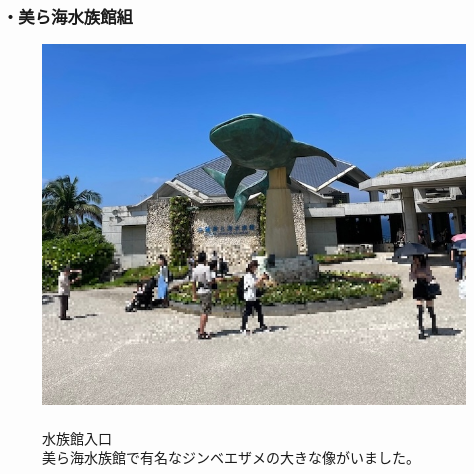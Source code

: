 \documentclass[../main]{subfiles}
\begin{document}
\subsubsection*{・美ら海水族館組}
\begin{figure}[H]
  \begin{minipage}[b]{0.48\columnwidth}
    \centering
    \includegraphics[width=0.8\columnwidth]{figure/tyuraumi_entrance.jpg}
  \end{minipage}
  \hspace{0.04\columnwidth} %
  \begin{minipage}[b]{0.48\columnwidth}
    \caption{\\
    水族館入口\\
    美ら海水族館で有名なジンベエザメの大きな像がいました。
    }
  \end{minipage}
\end{figure}
\end{document}
